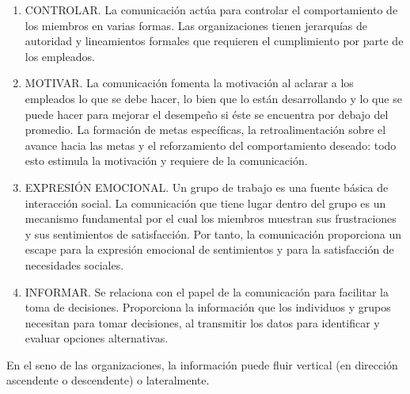 \documentclass[
]{krantz}
\providecommand{\tightlist}{%
  \setlength{\itemsep}{0pt}\setlength{\parskip}{0pt}}
\begin{document}
\begin{enumerate}
\def\labelenumi{\arabic{enumi}.}
\tightlist
\item
  CONTROLAR. La comunicación actúa para controlar el comportamiento de los miembros en varias formas. Las organizaciones tienen jerarquías de autoridad y lineamientos formales que requieren el cumplimiento por parte de los empleados.
\item
  MOTIVAR. La comunicación fomenta la motivación al aclarar a los empleados lo que se debe hacer, lo bien que lo están desarrollando y lo que se puede hacer para mejorar el desempeño si éste se encuentra por debajo del promedio. La formación de metas específicas, la retroalimentación sobre el avance hacia las metas y el reforzamiento del comportamiento deseado: todo esto estimula la motivación y requiere de la comunicación.
\item
  EXPRESIÓN EMOCIONAL. Un grupo de trabajo es una fuente básica de interacción social. La comunicación que tiene lugar dentro del grupo es un mecanismo fundamental por el cual los miembros muestran sus frustraciones y sus sentimientos de satisfacción. Por tanto, la comunicación proporciona un escape para la expresión emocional de sentimientos y para la satisfacción de necesidades sociales.
\item
  INFORMAR. Se relaciona con el papel de la comunicación para facilitar la toma de decisiones. Proporciona la información que los individuos y grupos necesitan para tomar decisiones, al transmitir los datos para identificar y evaluar opciones alternativas.
\end{enumerate}

En el seno de las organizaciones, la información puede fluir vertical (en dirección ascendente o descendente) o lateralmente.
\end{document}
